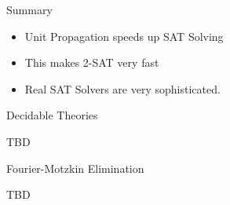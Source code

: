 \documentclass[xetex,aspectratio=169,14pt,hyperref={pdfpagelabels=true,pdflang={en-GB}}]{beamer}
\begin{document}
\begin{frame}
  {Summary}

  \begin{itemize}
  \item Unit Propagation speeds up SAT Solving \\
  \item This makes 2-SAT very fast
  \item Real SAT Solvers are very sophisticated.
  \end{itemize}
\end{frame}



\begin{frame}
  {Decidable Theories}

  TBD
\end{frame}


\begin{frame}
  {Fourier-Motzkin Elimination}

  TBD
\end{frame}
\end{document}
